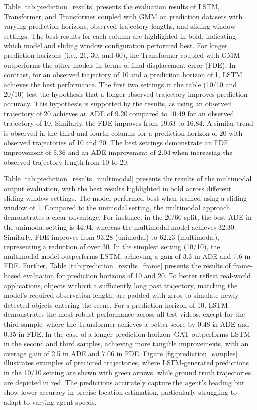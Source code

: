 Table \ref{tab:prediction_results} presents the evaluation results of LSTM, Transformer, and Transformer coupled with GMM on prediction datasets with varying prediction horizons, observed trajectory lengths, and sliding window settings. The best results for each column are highlighted in bold, indicating which model and sliding window configuration performed best. For longer prediction horizons (i.e., 20, 30, and 60), the Transformer coupled with GMM outperforms the other models in terms of final displacement error (FDE). In contrast, for an observed trajectory of 10 and a prediction horizon of 1, LSTM achieves the best performance. The first two settings in the table (10/10 and 20/10) test the hypothesis that a longer observed trajectory improves prediction accuracy. This hypothesis is supported by the results, as using an observed trajectory of 20 achieves an ADE of 9.20 compared to 10.49 for an observed trajectory of 10. Similarly, the FDE improves from 19.63 to 16.84. A similar trend is observed in the third and fourth columns for a prediction horizon of 20 with observed trajectories of 10 and 20. The best settings demonstrate an FDE improvement of 5.36 and an ADE improvement of 2.04 when increasing the observed trajectory length from 10 to 20.

Table \ref{tab:prediction_results_multimodal} presents the results of the multimodal output evaluation, with the best results highlighted in bold across different sliding window settings. The model performed best when trained using a sliding window of 1. Compared to the unimodal setting, the multimodal approach demonstrates a clear advantage. For instance, in the 20/60 split, the best ADE in the unimodal setting is 44.94, whereas the multimodal model achieves 32.30. Similarly, FDE improves from 93.28 (unimodal) to 62.23 (multimodal), representing a reduction of over 30. In the simplest setting (10/10), the multimodal model outperforms LSTM, achieving a gain of 3.3 in ADE and 7.6 in FDE. Further, Table \ref{tab:prediction_results_frame} presents the results of frame-based evaluation for prediction horizons of 10 and 20. To better reflect real-world applications, objects without a sufficiently long past trajectory, matching the model's required observation length, are padded with zeros to simulate newly detected objects entering the scene. For a prediction horizon of 10, LSTM demonstrates the most robust performance across all test videos, except for the third sample, where the Transformer achieves a better score by 0.48 in ADE and 0.35 in FDE. In the case of a longer prediction horizon, GAT outperforms LSTM in the second and third samples, achieving more tangible improvements, with an average gain of 2.5 in ADE and 7.06 in FDE. Figure \ref{fig:prediction_samples} illustrates examples of predicted trajectories, where LSTM-generated predictions in the 10/10 setting are shown with green arrows, while ground truth trajectories are depicted in red. The predictions accurately capture the agent's heading but show lower accuracy in precise location estimation, particularly struggling to adapt to varying agent speeds.


